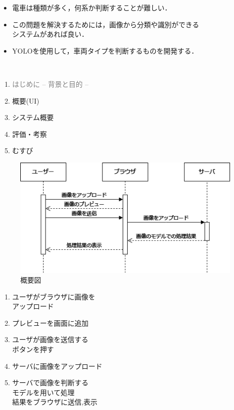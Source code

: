 \begin{itemize}
	\item 電車は種類が多く，何系か判断することが難しい．
	\item この問題を解決するためには，画像から分類や識別ができる\\システムがあれば良い．
	\item YOLOを使用して，車両タイプを判断するものを開発する．
\end{itemize}
\
\begin{enumerate}[itemsep=0.25\zh]
	\item \textcolor{gray}{はじめに -- 背景と目的 --}
	\item 概要(UI)
	\item システム概要
	\item 評価・考察
	\item むすび
\end{enumerate}
\newpage
\begin{minipage}[]{0.55\textwidth}\vspace{0pt}
\begin{figure}
	\centering
	\includegraphics[width=1.0\linewidth]{fig/tamura/gaiyou}
	\caption{概要図}
	\label{fig:gaiyou}
\end{figure}
\end{minipage}
\hfill
\begin{minipage}[]{0.45\textwidth}\vspace{0pt}
	\begin{enumerate}
		\item ユーザがブラウザに画像を\\アップロード
		\item プレビューを画面に追加
		\item  ユーザが画像を送信する\\ボタンを押す
		\item サーバに画像をアップロード
		\item サーバで画像を判断する\\モデルを用いて処理\\
		結果をブラウザに送信,表示\\
	\end{enumerate}
\end{minipage}
\newpage


